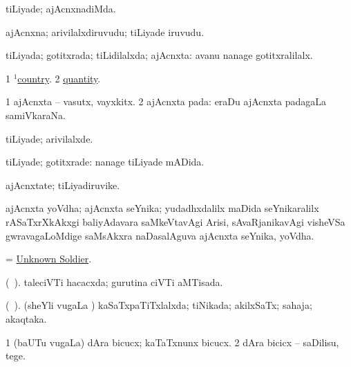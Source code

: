 \bentry
{} 
\gl{\kirxvi}
\expl{}
\bmng
tiLiyade; ajAcnxnadiMda. 
\emng
\eentry

\bentry
{} 
\gl{\nA}
\expl{}
\bmng
ajAcnxna; arivilalxdiruvudu; tiLiyade iruvudu. 
\emng
\eentry

\bentry
{} 
\gl{\gu}
\expl{}
\bmng
tiLiyada; gotitxrada; tiLidilalxda; ajAcnxta:  avanu nanage gotitxralilalx. 
\emng

\noindent
\gl{\pagu}
\expl{}
\bmng
\bnum
\num{1}  \hyperref{kandict_c.pdf}{C}{country(1) nuga(4)}{$^1$country}. 
\num{2}  \hyperref{kandict_q.pdf}{Q}{quantity pagu(2)}{quantity}. 
\enum
\emng
\eentry

\bentry
{} 
\gl{\nA}
\expl{}
\bmng
\bnum
\num{1} ajAcnxta -- vasutx, vayxkitx. 
\num{2} ajAcnxta pada:  eraDu ajAcnxta padagaLa samiVkaraNa. 
\enum
\emng
\eentry

\bentry
{} 
\gl{\kirxvi}
\expl{}
\bmng
tiLiyade; arivilalxde. 
\emng

\noindent 
\gl{\pagu}
\expl{}
\bmng
{} tiLiyade; gotitxrade:  nanage tiLiyade mADida. 
\emng
\eentry

\bentry
{} 
\gl{\nA}
\expl{}
\bmng
ajAcnxtate; tiLiyadiruvike. 
\emng
\eentry

\bentry
{}
\gl{\nA}
\expl{}
\bmng
ajAcnxta yoVdha; ajAcnxta seYnika; yudadhxdalilx maDida seYnikaralilx rASaTxrXkAkxgi baliyAdavara saMkeVtavAgi Arisi, sAvaRjanikavAgi visheVSa gwravagaLoMdige saMsAkxra naDasalAguva ajAcnxta seYnika, yoVdha. 
\emng
\eentry

\bentry
{}
\gl{\nA}
\expl{}
\bmng
= \hyperlink{Unknown Soldier}{Unknown Soldier}. 
\emng
\eentry

\bentry
{} 
\gl{\gu}
\expl{}
\bmng
(\ame\ ). taleciVTi hacacxda; gurutina ciVTi aMTisada. 
\emng
\eentry

\bentry
{} 
\gl{\gu}
\expl{}
\bmng
(\ame\ ). (sheYli \mo vugaLa \vi) kaSaTxpaTiTxlalxda; tiNikada; akilxSaTx; sahaja; akaqtaka. 
\emng
\eentry

\bentry
{} 
\gl{\sakirx}
\expl{}
\bmng
\bnum
\num{1} (baUTu \mo vugaLa) dAra bicucx; kaTaTxnunx bicucx. 
\num{2} dAra bicicx -- saDilisu, tege. 
\enum
\emng
\eentry

